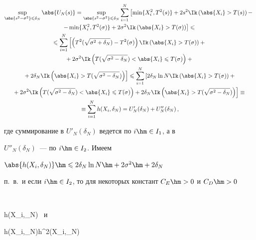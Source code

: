 \begin{multline*}

\sup\limits_{\abs{s^2-\sigma^2}\leqslant\delta_N}\abs{U_N(s)}=

\sup\limits_{\abs{s^2-\sigma^2}\leqslant\delta_N}\sum\limits_{i=1}^{N}\left[

\min\{X_i^2,T^2(s)\}+ 2s^2\Ik\left(\abs{X_i}>T(s)\right)-\right.{}\\

{}\left.-\min\{X_i^2,T^2(\sigma)\}+ 2\sigma^2\Ik\left(\abs{X_i}>T(\sigma)\right)\right]

\leqslant{}\\

{}\leqslant\sum\limits_{i=1}^{N}\left[\left(T^2(\sqrt{\sigma^2+\delta_N})-T^2(\sigma)\right)

\Ik\left(\abs{X_i}>T(\sigma)\right)+{}\right.\\

{}+2\sigma^2\Ik\left(T(\sqrt{\sigma^2-\delta_N})<\abs{X_i}

\leqslant T(\sigma)\right)+{}\\

{}\left.{}+2\delta_N\Ik\left(\abs{X_i}>T(\sqrt{\sigma^2-\delta_N})\right)\right]\leqslant

\sum\limits_{i=1}^{N}\left[2\delta_N\ln N\Ik\left(\abs{X_i}>T(\sigma)\right)+{}\right.\\

\left.{}+2\sigma^2\Ik\left(T(\sqrt{\sigma^2-\delta_N})<\abs{X_i}\leqslant

T(\sigma)\right)+2\delta_N\Ik\left(\abs{X_i}>T(\sqrt{\sigma^2-\delta_N})\right)\right]\equiv{}\\

{}\equiv\sum\limits_{i=1}^{N}h(X_i,\delta_N)=U'_N(\delta_N)+U''_N(\delta_N)\,,

\end{multline*}

где суммирование в $U'_N(\delta_N)$ ведется по $i\hm\in I_1$, а в

$U''_N(\delta_N)$~--- по $i\hm\in I_2$. Имеем

$\abs{h(X_i,\delta_N)}\hm\leqslant2\delta_N\ln N\hm+2\sigma^2\hm+2\delta_N$

п.~в.\ и если $i\hm\in I_2$, то для некоторых констант $C_E\hm>0$ и $C_D\hm>0$

$$

h(X_i,\delta_N)\leqslant{} \ \mbox{и}\ 

h(X_i,\delta_N)\leqslant{}h^2(X_i,\delta_N)\leqslant

